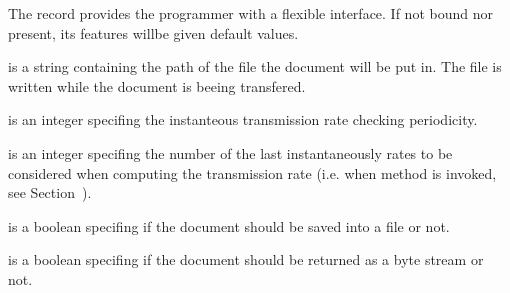 \documentclass{ozdoc}
\begin{document}
\begin{mozartDESCRIPTION}
\mozartENTRYHASCODE
\begin{mozartSYNOPSIS}
\begin{mozartCODEDISPLAY}\mozartFACETEXT{\mozartSPACE{}}\mozartFACEKEYWORD{\mozartLT{}=}\mozartFACETEXT{\mozartSPACE{}}\mozartFACEKEYWORD{\mozartLT{}=}\mozartFACETEXT{\mozartSPACE{}}\mozartFACEKEYWORD{\mozartLT{}=}\mozartFACETEXT{\mozartSPACE{}}\mozartFACEKEYWORD{\mozartLT{}=}\mozartFACETEXT{\mozartSPACE{}}\mozartFACETEXT{\mozartSPACE{}}\mozartFACEKEYWORD{\mozartLT{}=}\mozartFACETEXT{\mozartSPACE{}}\mozartFACETEXT{)}\end{mozartCODEDISPLAY}
\end{mozartSYNOPSIS}
\mozartITEM The  record provides the programmer with a flexible interface. If not bound nor present, its features willbe given default values. 

 is a string containing the path of the file the document will be put in. The file is written while the document is beeing transfered.

 is an integer specifing the instanteous transmission rate checking periodicity. 

 is an integer specifing the number of the last instantaneously rates to be considered when computing the transmission rate (i.e. when method  is invoked, see Section~).

 is a boolean specifing if the document should be saved into a file or not. 

 is a boolean specifing if the document should be returned as a byte stream or not.  \mozartEMPTY
\end{mozartDESCRIPTION}
\end{document}
